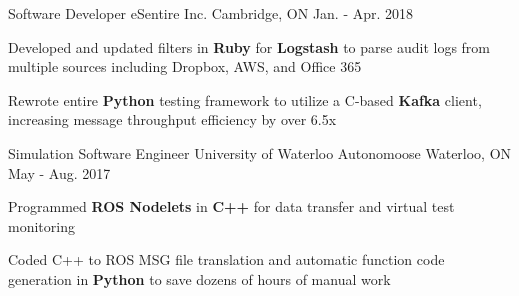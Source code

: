 \begin{cventries}
\cventry
{Software Developer} %
{eSentire Inc.} %
{Cambridge, ON} %
{Jan. - Apr. 2018} %
{%
\begin{cvitems}
\item {Developed and updated filters in {\bf Ruby} for {\bf Logstash} to parse audit logs from multiple sources including Dropbox, AWS, and Office 365}
\item{Rewrote entire {\bf Python} testing framework to utilize a C-based {\bf Kafka} client, increasing message throughput efficiency by over 6.5x}
\end{cvitems}
}


\cventry
{Simulation Software Engineer} %
{University of Waterloo Autonomoose} %
{Waterloo, ON} %
{May - Aug. 2017} %
{%
\begin{cvitems}
\item {Programmed {\bf ROS Nodelets} in {\bf C++} for data transfer and virtual test monitoring}
\item {Coded C++ to ROS MSG file translation and automatic function code generation in {\bf Python} to save dozens of hours of manual work}
\end{cvitems} 
}


\end{cventries}
